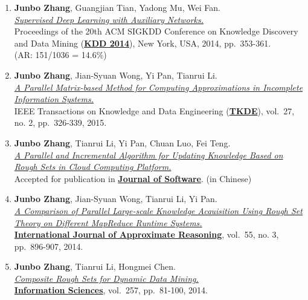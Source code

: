 \documentclass[10pt,a4paper]{article}
\begin{document}
\begin{enumerate}
\def\labelenumi{\arabic{enumi}.}
\item
  \textbf{Junbo Zhang}, Guangjian Tian, Yadong Mu, Wei Fan.\\
  \href{http://dx.doi.org/10.1145/2623330.2623618}{\emph{Supervised Deep
  Learning with Auxiliary Networks.}}\\ Proceedings of the 20th ACM
  SIGKDD Conference on Knowledge Discovery and Data Mining
  (\href{http://www.kdd.org/kdd2014/}{\textbf{KDD 2014}}), New York,
  USA, 2014, pp.~353-361.\\ (AR: 151/1036 = 14.6\%)
\item
  \textbf{Junbo Zhang}, Jian-Syuan Wong, Yi Pan, Tianrui Li.\\
  \href{http://dx.doi.org/10.1109/TKDE.2014.2330821}{\emph{A Parallel
  Matrix-based Method for Computing Approximations in Incomplete
  Information Systems.}}\\ IEEE Transactions on Knowledge and Data
  Engineering
  (\href{http://www.computer.org/portal/web/tkde}{\textbf{TKDE}}),
  vol.~27, no. 2, pp.~326-339, 2015.
\item
  \textbf{Junbo Zhang}, Tianrui Li, Yi Pan, Chuan Luo, Fei Teng.\\
  \href{http://www.jos.org.cn/ch/reader/view_abstract.aspx?file_no=4590}{\emph{A
  Parallel and Incremental Algorithm for Updating Knowledge Based on
  Rough Sets in Cloud Computing Platform.}}\\ Accepted for publication
  in \href{http://www.jos.org.cn/ch/index.aspx}{\textbf{Journal of
  Software}}. (in Chinese)
\item
  \textbf{Junbo Zhang}, Jian-Syuan Wong, Tianrui Li, Yi Pan.\\
  \href{http://dx.doi.org/10.1016/j.ijar.2013.08.003}{\emph{A Comparison
  of Parallel Large-scale Knowledge Acquisition Using Rough Set Theory
  on Different MapReduce Runtime Systems.}}\\
  \href{http://www.journals.elsevier.com/international-journal-of-approximate-reasoning}{\textbf{International
  Journal of Approximate Reasoning}}, vol.~55, no. 3, pp.~896-907, 2014.
\item
  \textbf{Junbo Zhang}, Tianrui Li, Hongmei Chen.\\
  \href{http://dx.doi.org/10.1016/j.ins.2013.08.016}{\emph{Composite
  Rough Sets for Dynamic Data Mining.}}\\
  \href{http://www.journals.elsevier.com/information-sciences}{\textbf{Information
  Sciences}}, vol.~257, pp.~81-100, 2014.

\end{enumerate}
\end{document}
